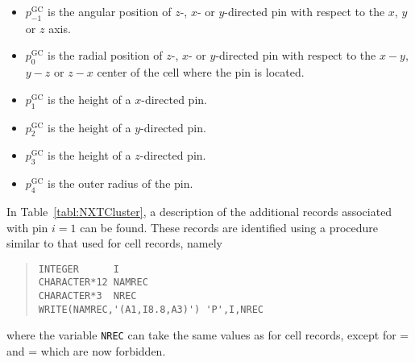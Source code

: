 \begin{itemize}
\item $p^{\text{GC}}_{-1}$ is the angular position of $z$-, $x$- or $y$-directed pin with respect to the $x$, $y$ or $z$ axis. 
\item $p^{\text{GC}}_{0}$ is the radial position of $z$-, $x$- or $y$-directed pin with respect to the $x-y$, $y-z$ or $z-x$ center of the cell where the pin is located. 
\item $p^{\text{GC}}_{1}$ is the height of a $x$-directed pin.
\item $p^{\text{GC}}_{2}$ is the height of a $y$-directed pin.
\item $p^{\text{GC}}_{3}$ is the height of a $z$-directed pin.
\item $p^{\text{GC}}_{4}$ is the outer radius of the pin.
\end{itemize}

In Table~\ref{tabl:NXTCluster}, a description of the additional  records associated with pin $i=1$ can be found. These records are identified using a procedure similar to that used for cell records, namely
\begin{quote}
\begin{verbatim}
INTEGER      I
CHARACTER*12 NAMREC
CHARACTER*3  NREC
WRITE(NAMREC,'(A1,I8.8,A3)') 'P',I,NREC
\end{verbatim}
\end{quote}
where the variable \verb|NREC| can take the same values as for cell records, except for = and = which are now forbidden.

